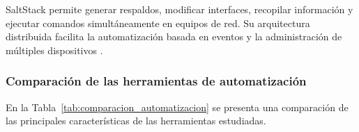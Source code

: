 \documentclass[12pt,a4paper]{article}
\begin{document}
SaltStack permite generar respaldos, modificar interfaces, recopilar información y ejecutar comandos simultáneamente en equipos de red. Su arquitectura distribuida facilita la automatización basada en eventos y la administración de múltiples dispositivos \parencite{myers2015saltstack,salt_napalm_proxy}.



\subsubsection{Comparación de las herramientas de automatización}
\label{sec:comparacion_herramientas}

En la Tabla~\ref{tab:comparacion_automatizacion} se presenta
una comparación de las principales características de
las herramientas estudiadas.
\end{document}
